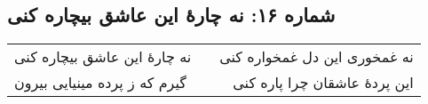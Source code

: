 \begin{center}
\section*{شماره ۱۶: نه چارۀ این عاشق بیچاره کنی}
\label{sec:016}
\begin{longtable}{l p{0.5cm} r}
نه چارهٔ این عاشق بیچاره کنی
&&
نه غمخوری این دل غمخواره کنی
\\
گیرم که ز پرده مینیایی بیرون
&&
این پردهٔ عاشقان چرا پاره کنی
\\
\end{longtable}
\end{center}
